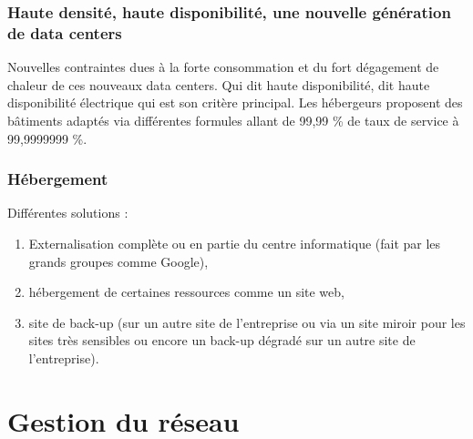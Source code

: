 \documentclass[10pt,a4paper,oneside,titlepage]{report}
\begin{document}
\subsubsection{Haute densité, haute disponibilité, une nouvelle génération de data centers}

Nouvelles contraintes dues à la forte consommation et du fort dégagement de chaleur de ces nouveaux data centers. Qui dit haute disponibilité, dit haute disponibilité électrique qui est son critère principal. Les hébergeurs proposent des b\^atiments adaptés via différentes formules allant de 99,99 \% de taux de service à 99,9999999 \%.

\subsubsection{Hébergement}

Différentes solutions :
\begin{enumerate}
\item Externalisation complète ou en partie du centre informatique (fait par les grands groupes comme Google),
\item hébergement de certaines ressources comme un site web,
\item site de back-up (sur un autre site de l'entreprise ou via un site miroir pour les sites très sensibles ou encore un back-up dégradé sur un autre site de l'entreprise).
\end{enumerate}

\section{Gestion du réseau}
\end{document}
